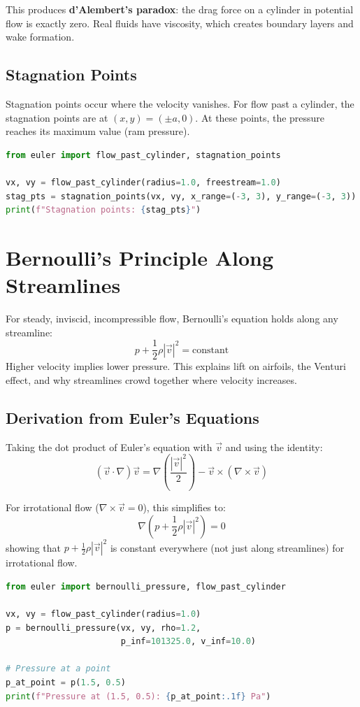 This produces \textbf{d'Alembert's paradox}: the drag force on a cylinder in potential flow is exactly zero.
Real fluids have viscosity, which creates boundary layers and wake formation.

\subsection{Stagnation Points}

Stagnation points occur where the velocity vanishes. For flow past a cylinder, the stagnation
points are at $(x,y) = (\pm a, 0)$. At these points, the pressure reaches its maximum value
(ram pressure).

\begin{lstlisting}[language=Python, caption=Finding stagnation points]
from euler import flow_past_cylinder, stagnation_points

vx, vy = flow_past_cylinder(radius=1.0, freestream=1.0)
stag_pts = stagnation_points(vx, vy, x_range=(-3, 3), y_range=(-3, 3))
print(f"Stagnation points: {stag_pts}")
\end{lstlisting}

\section{Bernoulli's Principle Along Streamlines}

For steady, inviscid, incompressible flow, Bernoulli's equation holds along any streamline:
\[
p + \frac{1}{2}\rho|\vec{v}|^2 = \text{constant}
\]
Higher velocity implies lower pressure. This explains lift on airfoils, the Venturi effect,
and why streamlines crowd together where velocity increases.

\subsection{Derivation from Euler's Equations}

Taking the dot product of Euler's equation with $\vec{v}$ and using the identity:
\[
(\vec{v} \cdot \nabla)\vec{v} = \nabla\left(\frac{|\vec{v}|^2}{2}\right) - \vec{v} \times (\nabla \times \vec{v})
\]

For irrotational flow ($\nabla \times \vec{v} = 0$), this simplifies to:
\[
\nabla\left(p + \frac{1}{2}\rho|\vec{v}|^2\right) = 0
\]
showing that $p + \frac{1}{2}\rho|\vec{v}|^2$ is constant everywhere (not just along streamlines)
for irrotational flow.

\begin{lstlisting}[language=Python, caption=Computing pressure from Bernoulli]
from euler import bernoulli_pressure, flow_past_cylinder

vx, vy = flow_past_cylinder(radius=1.0)
p = bernoulli_pressure(vx, vy, rho=1.2,
                       p_inf=101325.0, v_inf=10.0)

# Pressure at a point
p_at_point = p(1.5, 0.5)
print(f"Pressure at (1.5, 0.5): {p_at_point:.1f} Pa")
\end{lstlisting}

